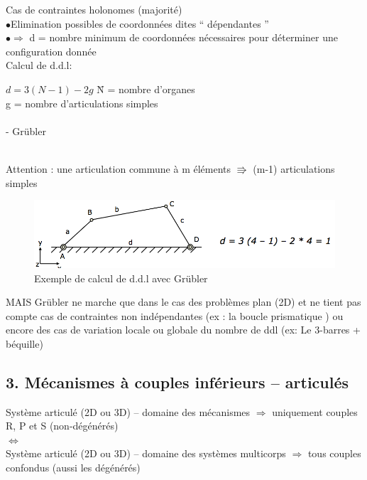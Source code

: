 Cas de contraintes holonomes (majorité) \\
$\bullet$Elimination possibles de coordonnées dites “ dépendantes ”\\
$\bullet \Rightarrow$ d = nombre minimum de coordonnées nécessaires pour déterminer une configuration donnée\\

Calcul de d.d.l:\\

\begin{bluebox}
\begin{tabbing}
$d = 3 (N-1)-2 g$ \hspace{1cm}\= N = nombre d’organes\=\\
\> g = nombre d’articulations simples
\\\\
\> \>- Grübler
\end{tabbing}
\end{bluebox}\\
{\color{red}Attention} : une articulation commune à m éléments $\Rrightarrow$ (m-1) articulations simples\\

\begin{figure}[H]
\centering
\includegraphics[width=.8\linewidth]{grubler.png}
\caption{Exemple de calcul de d.d.l avec Grübler}
\label{grubler}
\end{figure}

{\color{red}MAIS} Grübler ne marche que dans le cas des problèmes {\color{orange}plan} (2D) et ne tient pas compte cas de {\color{orange}contraintes non indépendantes} (ex : la boucle prismatique ) ou encore des cas de variation {\color{orange}locale} ou {\color{orange}globale} du nombre de ddl (ex: Le 3-barres + béquille)\\

\subsection*{3. Mécanismes à couples inférieurs – articulés}
{\color{orange}Système articulé} (2D ou 3D) – domaine des {\color{orange}mécanismes} $\Rightarrow$ uniquement couples {\color{orange}R}, {\color{orange}P} et {\color{orange}S} (non-dégénérés)\\
$\Leftrightarrow$\\
Système articulé (2D ou 3D) – domaine des systèmes {\color{orange}multicorps} $\Rightarrow$ tous couples confondus (aussi les dégénérés)\\

